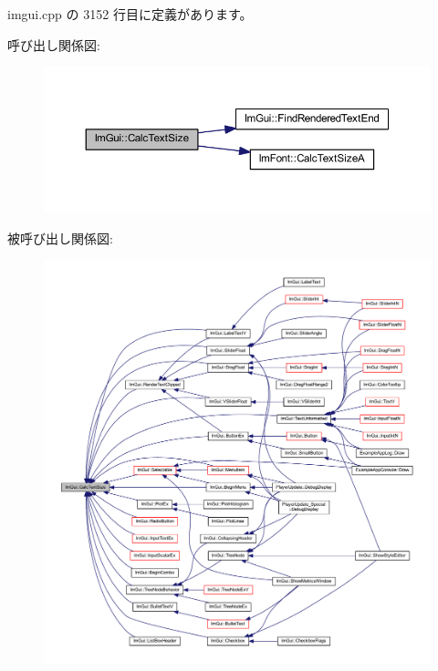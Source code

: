  imgui.\+cpp の 3152 行目に定義があります。

呼び出し関係図\+:\nopagebreak
\begin{figure}[H]
\begin{center}
\leavevmode
\includegraphics[width=350pt]{namespace_im_gui_a848b9db6cc4a186751c0ecebcaadc33b_cgraph}
\end{center}
\end{figure}
被呼び出し関係図\+:\nopagebreak
\begin{figure}[H]
\begin{center}
\leavevmode
\includegraphics[width=350pt]{namespace_im_gui_a848b9db6cc4a186751c0ecebcaadc33b_icgraph}
\end{center}
\end{figure}
\mbox{\label{namespace_im_gui_ad3af0fc327467a44116d7d04018b9124}} 
